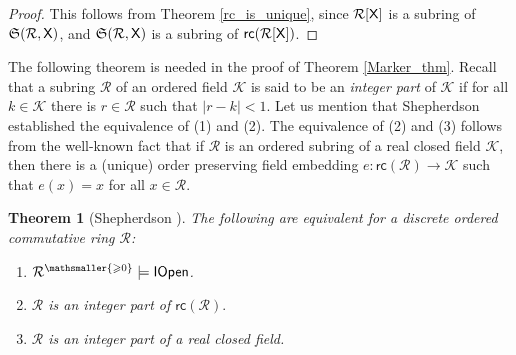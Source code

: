 \documentclass{amsart}
\renewcommand{\geq}{\geqslant}
\newtheorem{theorem}{Theorem}[section]
\newcommand{\mc}[1]{\mathcal #1}
\newcommand{\X}{{\sf X}}
\newcommand{\shef}{\mathfrak{S}}
\begin{document}
\begin{proof} This follows from Theorem \ref{rc_is_unique},
since $\mc R[\X]$ is a subring of $\shef(\mc R,\X)$, and $\shef(\mc R,\X)$ is a subring of $\mathsf{rc}(\mc R[\X])$.
\end{proof}

The following theorem is needed in the proof of Theorem \ref{Marker_thm}. Recall that a subring $\mc R$ of an ordered field $\mc K$ is 
said to be an \emph{integer part} of $\mc K$ if for all $k\in \mc K$ there is $r\in \mc R$ such that $\left\vert r-k\right\vert <1$. Let us mention that 
Shepherdson established the equivalence of (1) and (2). The equivalence of (2) and (3) follows from the well-known fact that if 
$\mc R$ is an ordered subring of a real closed field $\mc K$, then there is a (unique) order preserving field embedding 
$e:\mathsf{rc}(\mc R)\rightarrow \mc K$ such that $e(x)=x$ for all $x\in \mc R$.

\begin{theorem} [Shepherdson \cite{shep:nons64}] \label{Shepherdson_thm} The following are equivalent for a discrete ordered commutative ring $\mc R$:
\begin{enumerate}[$1$.]
    \item  $\mc R^{\mathsmaller{\geq 0}}\models {\sf IOpen}$.
    \item $\mc R$ is an integer part of $\mathsf{rc}(\mc R).$
    \item $\mc R$ is an integer part of a real closed field.
\end{enumerate}
\end{theorem}
\end{document}
